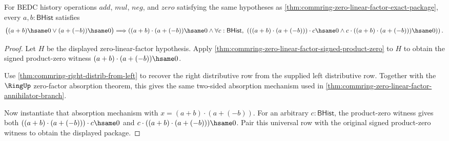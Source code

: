 \begin{theorem}
\label{thm:commring-zero-linear-factor-signed-product-annihilator-package}
For BEDC history operations $add$, $mul$, $neg$, and $zero$ satisfying the same
hypotheses as \autoref{thm:commring-zero-linear-factor-exact-package}, every
$a,b : \mathsf{BHist}$ satisfies
$$
\bigl((a+b)\hsame0 \lor (a+(-b))\hsame0\bigr)
\Longrightarrow
\left(
(a+b)\cdot(a+(-b))\hsame0
\land
\forall c : \mathsf{BHist},\
\left(
((a+b)\cdot(a+(-b)))\cdot c\hsame0
\land
c\cdot((a+b)\cdot(a+(-b)))\hsame0
\right)
\right).
$$
\end{theorem}
\begin{proof}
Let $H$ be the displayed zero-linear-factor hypothesis. Apply
\autoref{thm:commring-zero-linear-factor-signed-product-zero} to $H$ to obtain
the signed product-zero witness
$(a+b)\cdot(a+(-b))\hsame0$.

Use \autoref{thm:commring-right-distrib-from-left} to recover the right
distributive row from the supplied left distributive row. Together with the
$\RingUp$ zero-factor absorption theorem, this gives the same two-sided
absorption mechanism used in
\autoref{thm:commring-zero-linear-factor-annihilator-branch}.

Now instantiate that absorption mechanism with
$x=(a+b)\cdot(a+(-b))$. For an arbitrary $c:\mathsf{BHist}$, the product-zero
witness gives both $((a+b)\cdot(a+(-b)))\cdot c\hsame0$ and
$c\cdot((a+b)\cdot(a+(-b)))\hsame0$. Pair this universal row with the original
signed product-zero witness to obtain the displayed package.
\end{proof}

